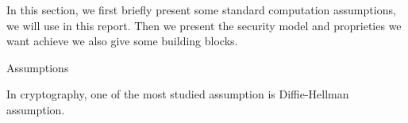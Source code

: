 In this section, we first briefly present some standard computation assumptions, we will use in this report.  
Then we present the security model and proprieties we want achieve we also give some building blocks.

\begin{subsection}{Assumptions}

  In cryptography, one of the most studied assumption is Diffie-Hellman assumption.

\end{subsection}




